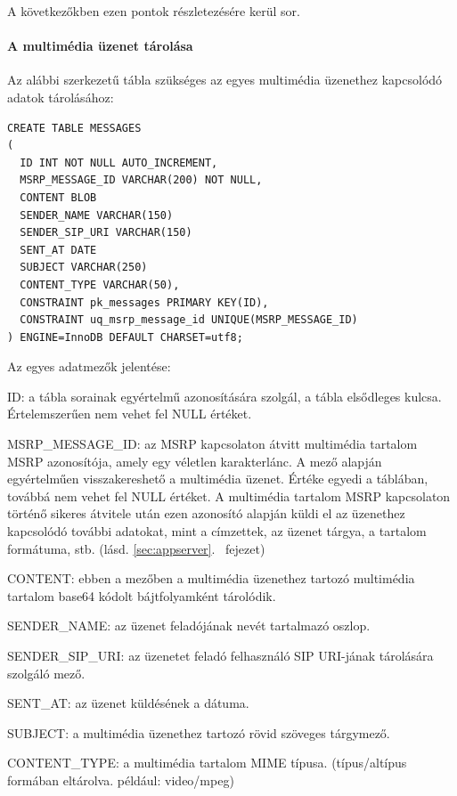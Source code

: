 A következőkben ezen pontok részletezésére kerül sor.

\paragraph*{A multimédia üzenet tárolása\\}

Az alábbi szerkezetű tábla szükséges az egyes multimédia üzenethez kapcsolódó adatok tárolásához:
\fontsize{10}{10}
\begin{verbatim}
CREATE TABLE MESSAGES
(
  ID INT NOT NULL AUTO_INCREMENT,
  MSRP_MESSAGE_ID VARCHAR(200) NOT NULL,
  CONTENT BLOB
  SENDER_NAME VARCHAR(150)
  SENDER_SIP_URI VARCHAR(150)
  SENT_AT DATE
  SUBJECT VARCHAR(250)
  CONTENT_TYPE VARCHAR(50),
  CONSTRAINT pk_messages PRIMARY KEY(ID),
  CONSTRAINT uq_msrp_message_id UNIQUE(MSRP_MESSAGE_ID)
) ENGINE=InnoDB DEFAULT CHARSET=utf8;
\end{verbatim}
\fontsize{12}{12}

Az egyes adatmezők jelentése:
\begin{mydescription}
\item[ID:] a tábla sorainak egyértelmű azonosítására szolgál, a tábla elsődleges kulcsa. Értelemszerűen nem vehet fel NULL értéket.
\item[MSRP\_MESSAGE\_ID:] az MSRP kapcsolaton átvitt multimédia tartalom MSRP azonosítója, amely egy véletlen karakterlánc. A mező alapján egyértelműen visszakereshető a multimédia üzenet. Értéke egyedi a táblában, továbbá nem vehet fel NULL értéket. A multimédia tartalom MSRP kapcsolaton történő sikeres átvitele után ezen azonosító alapján küldi el az üzenethez kapcsolódó további adatokat, mint a címzettek, az üzenet tárgya, a tartalom formátuma, stb. (lásd. \ref{sec:appserver}.~ fejezet) 
\item[CONTENT:] ebben a mezőben a multimédia üzenethez tartozó multimédia tartalom base64 kódolt bájtfolyamként tárolódik.
\item[SENDER\_NAME:] az üzenet feladójának nevét tartalmazó oszlop.
\item[SENDER\_SIP\_URI:] az üzenetet feladó felhasználó SIP URI-jának tárolására szolgáló mező.
\item[SENT\_AT:] az üzenet küldésének a dátuma. 
\item[SUBJECT:] a multimédia üzenethez tartozó rövid szöveges tárgymező.
\item[CONTENT\_TYPE:] a multimédia tartalom MIME típusa. (típus/altípus formában eltárolva. például: video/mpeg)
\end{mydescription}
\medskip

